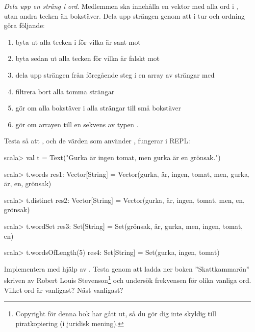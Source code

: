 \Task \emph{Dela upp en sträng i ord}. Medlemmen  ska innehålla en vektor med alla ord i , utan andra tecken än bokstäver.
Dela upp strängen  genom att i tur och ordning göra följande:
\begin{enumerate}%
\item byta ut alla tecken i  för vilka  är sant mot 
\item byta sedan ut alla tecken för vilka  är falskt mot 
\item dela upp strängen från föregående steg i en array av strängar med 
\item filtrera bort alla tomma strängar
\item gör om alla bokstäver i alla strängar till små bokstäver
\item gör om arrayen till en sekvens av typen .
\end{enumerate}

\noindent Testa så att , och de värden som använder , fungerar i REPL:
\begin{REPL}
scala> val t = Text("Gurka är ingen tomat, men gurka är en grönsak.")

scala> t.words
res1: Vector[String] =
  Vector(gurka, är, ingen, tomat, men, gurka, är, en, grönsak)

scala> t.distinct
res2: Vector[String] =
  Vector(gurka, är, ingen, tomat, men, en, grönsak)

scala> t.wordSet
res3: Set[String] = Set(grönsak, är, gurka, men, ingen, tomat, en)

scala> t.wordsOfLength(5)
res4: Set[String] = Set(gurka, ingen, tomat)

\end{REPL}



\begin{figure}[t]
\end{figure}


\Task Implementera  med hjälp av . Testa  genom att ladda ner boken ''Skattkammarön'' skriven av Robert Louis Stevenson\footnote{Copyright för denna bok har gått ut, så du gör dig inte skyldig till piratkopiering (i juridisk mening).} och undersök frekvensen för olika vanliga ord. Vilket ord är vanligast? Näst vanligast?

